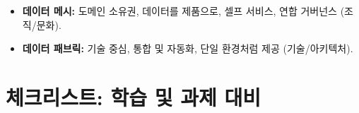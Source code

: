 \documentclass[11pt,a4paper]{article}
\begin{document}
\begin{tcolorbox}[title=\textbf{데이터 아키텍처 패러다임}, colback=purple!5!white, colframe=purple!75!black, sharp corners, boxrule=0.8pt]
\begin{itemize}
    \item \textbf{데이터 메시:} 도메인 소유권, 데이터를 제품으로, 셀프 서비스, 연합 거버넌스 (조직/문화).
    \item \textbf{데이터 패브릭:} 기술 중심, 통합 및 자동화, 단일 환경처럼 제공 (기술/아키텍처).
\end{itemize}
\end{tcolorbox}

\newpage
\section*{체크리스트: 학습 및 과제 대비}
\end{document}

